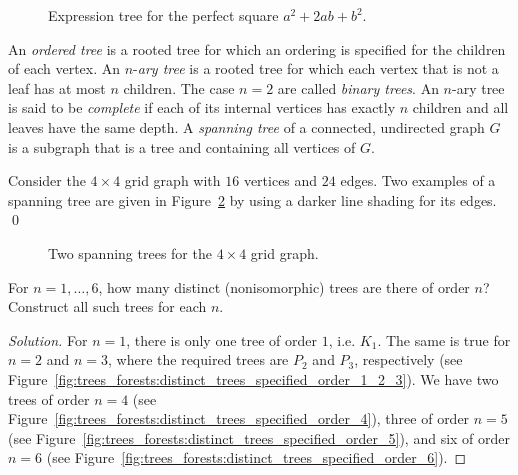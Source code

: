 \begin{figure}[!htbp]
\centering
{}

\caption{Expression tree for the perfect square $a^2 + 2ab + b^2$.}
\label{fig:trees_forests:expression_tree_perfect_square}
\end{figure}

An \emph{ordered tree} is a
rooted tree for which an ordering is specified for
the children of each vertex. An
$n$-\emph{ary tree} is a rooted tree for which
each vertex that is not a leaf has at most $n$
children. The case $n = 2$ are called
\emph{binary trees}. An $n$-ary
tree is said to be \emph{complete} if each of its
internal vertices has exactly $n$
children and all leaves have
the same depth. A
\emph{spanning tree} of a connected, undirected
graph $G$ is a subgraph that is a tree and containing all vertices of
$G$.

\begin{example}
\label{eg:trees_forests:spanning_tree}
{\rm
Consider the $4 \times 4$ grid graph with $16$
vertices and $24$ edges. Two examples of a
spanning tree are given in
Figure~\ref{fig:trees_forests:grid_graph_spanning_trees} by using a
darker line shading for its edges.}
\qed
\end{example}

\begin{figure}[!htbp]
\centering
{}

\caption{Two spanning trees for the $4 \times 4$ grid graph.}
\label{fig:trees_forests:grid_graph_spanning_trees}
\end{figure}

\begin{example}
For $n = 1, \dots, 6$, how many distinct
(nonisomorphic) trees are there of order
$n$? Construct all such trees for each $n$.
\end{example}

\begin{proof}[Solution]
For $n = 1$, there is only one tree of order $1$, i.e. $K_1$. The same
is true for $n = 2$ and $n = 3$, where the required trees are $P_2$
and $P_3$, respectively (see
Figure~\ref{fig:trees_forests:distinct_trees_specified_order_1_2_3}). We
have two trees of order $n = 4$ (see
Figure~\ref{fig:trees_forests:distinct_trees_specified_order_4}),
three of order $n = 5$ (see
Figure~\ref{fig:trees_forests:distinct_trees_specified_order_5}), and
six of order $n = 6$ (see
Figure~\ref{fig:trees_forests:distinct_trees_specified_order_6}).
\end{proof}

